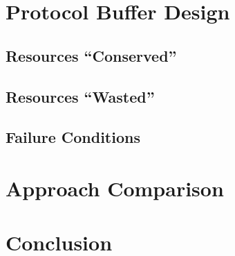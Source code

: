 \documentclass[11pt]{article} %
\begin{document}
\section{Protocol Buffer Design}

\subsection{Resources ``Conserved''} 

\subsection{Resources ``Wasted''}

\subsection{Failure Conditions}

\section{Approach Comparison} 

\section{Conclusion} 
\end{document}
